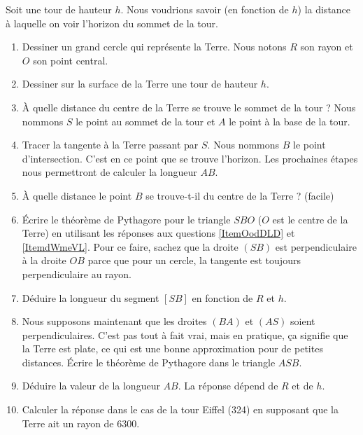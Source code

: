 
\begin{exercice}\label{exoSeconde-0080}


    Soit une tour de hauteur \( h\). Nous voudrions savoir (en fonction de \( h\)) la distance à laquelle on voir l'horizon du sommet de la tour.
    \begin{enumerate}
        \item
            Dessiner un grand cercle qui représente la Terre. Nous notons \( R\) son rayon et \( O\) son point central.
        \item   \label{ItemOodDLD}
            Dessiner sur la surface de la Terre une tour de hauteur \( h\).
        \item
            À quelle distance du centre de la Terre se trouve le sommet de la tour ? Nous nommons \( S\) le point au sommet de la tour et \( A\) le point à la base de la tour.
        \item
            Tracer la tangente à la Terre passant par \( S\). Nous nommons \( B\) le point d'intersection. C'est en ce point que se trouve l'horizon. Les prochaines étapes nous permettront de calculer la longueur \( AB\).
        \item   \label{ItemdWmeVL}
            À quelle distance le point \( B\) se trouve-t-il du centre de la Terre ? (facile)
        \item
            Écrire le théorème de Pythagore pour le triangle \( SBO\) (\( O\) est le centre de la Terre) en utilisant les réponses aux questions \ref{ItemOodDLD} et \ref{ItemdWmeVL}. Pour ce faire, sachez que la droite \( (SB)\) est perpendiculaire à la droite \( OB\) parce que pour un cercle, la tangente est toujours perpendiculaire au rayon.
        \item
            Déduire la longueur du segment \( [SB]\) en fonction de \( R\) et \( h\).
        \item
            Nous supposons maintenant que les droites \( (BA)\) et \( (AS)\) soient perpendiculaires. C'est pas tout à fait vrai, mais en pratique, ça signifie que la Terre est plate, ce qui est une bonne approximation pour de petites distances. Écrire le théorème de Pythagore dans le triangle \( ASB\).
        \item
            Déduire la valeur de la longueur \( AB\). La réponse dépend de \( R\) et de \( h\).
        \item
            Calculer la réponse dans le cas de la tour Eiffel (\unit{324}{\meter}) en supposant que la Terre ait un rayon de \unit{6300}{\kilo\meter}.
    \end{enumerate}

\end{exercice}
